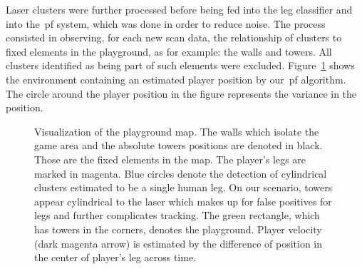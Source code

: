 Laser clusters were further processed before being fed into the leg classifier and into the~\gls{pf} system, which was done in order to reduce noise. The process consisted in observing, for each new scan data, the relationship of clusters to fixed elements in the playground, as for example: the walls and towers. All clusters identified as being part of such elements were excluded. Figure~\ref{fig:laser_tracking} shows the environment containing an estimated player position by our~\gls{pf} algorithm. The circle around the player position in the figure represents the variance in the position.

\begin{figure}[h]
    \centering 
    \caption{Visualization of the playground map. The walls which isolate the game area and the absolute towers positions are denoted in black. Those are the fixed elements in the map. The player's legs are marked in magenta. Blue circles denote the detection of cylindrical clusters estimated to be a single human leg. On our scenario, towers appear cylindrical to the laser which makes up for false positives for legs and further complicates tracking. The green rectangle, which has towers in the corners, denotes the playground. Player velocity (dark magenta arrow) is estimated by the difference of position in the center of player's leg across time.}
    \label{fig:laser_tracking}
\end{figure}

